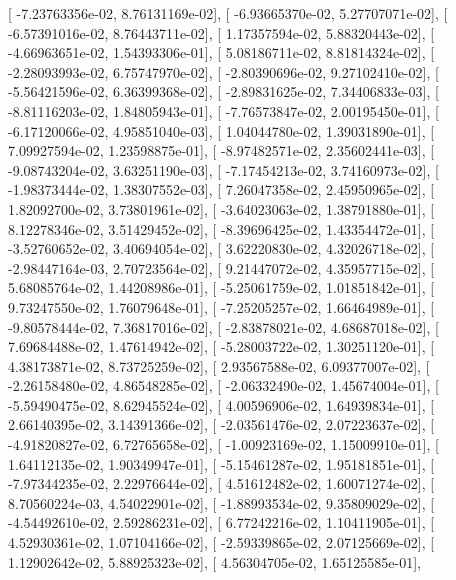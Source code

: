 \documentclass{article}
\begin{document}
       [ -7.23763356e-02,   8.76131169e-02],
       [ -6.93665370e-02,   5.27707071e-02],
       [ -6.57391016e-02,   8.76443711e-02],
       [  1.17357594e-02,   5.88320443e-02],
       [ -4.66963651e-02,   1.54393306e-01],
       [  5.08186711e-02,   8.81814324e-02],
       [ -2.28093993e-02,   6.75747970e-02],
       [ -2.80390696e-02,   9.27102410e-02],
       [ -5.56421596e-02,   6.36399368e-02],
       [ -2.89831625e-02,   7.34406833e-03],
       [ -8.81116203e-02,   1.84805943e-01],
       [ -7.76573847e-02,   2.00195450e-01],
       [ -6.17120066e-02,   4.95851040e-03],
       [  1.04044780e-02,   1.39031890e-01],
       [  7.09927594e-02,   1.23598875e-01],
       [ -8.97482571e-02,   2.35602441e-03],
       [ -9.08743204e-02,   3.63251190e-03],
       [ -7.17454213e-02,   3.74160973e-02],
       [ -1.98373444e-02,   1.38307552e-03],
       [  7.26047358e-02,   2.45950965e-02],
       [  1.82092700e-02,   3.73801961e-02],
       [ -3.64023063e-02,   1.38791880e-01],
       [  8.12278346e-02,   3.51429452e-02],
       [ -8.39696425e-02,   1.43354472e-01],
       [ -3.52760652e-02,   3.40694054e-02],
       [  3.62220830e-02,   4.32026718e-02],
       [ -2.98447164e-03,   2.70723564e-02],
       [  9.21447072e-02,   4.35957715e-02],
       [  5.68085764e-02,   1.44208986e-01],
       [ -5.25061759e-02,   1.01851842e-01],
       [  9.73247550e-02,   1.76079648e-01],
       [ -7.25205257e-02,   1.66464989e-01],
       [ -9.80578444e-02,   7.36817016e-02],
       [ -2.83878021e-02,   4.68687018e-02],
       [  7.69684488e-02,   1.47614942e-02],
       [ -5.28003722e-02,   1.30251120e-01],
       [  4.38173871e-02,   8.73725259e-02],
       [  2.93567588e-02,   6.09377007e-02],
       [ -2.26158480e-02,   4.86548285e-02],
       [ -2.06332490e-02,   1.45674004e-01],
       [ -5.59490475e-02,   8.62945524e-02],
       [  4.00596906e-02,   1.64939834e-01],
       [  2.66140395e-02,   3.14391366e-02],
       [ -2.03561476e-02,   2.07223637e-02],
       [ -4.91820827e-02,   6.72765658e-02],
       [ -1.00923169e-02,   1.15009910e-01],
       [  1.64112135e-02,   1.90349947e-01],
       [ -5.15461287e-02,   1.95181851e-01],
       [ -7.97344235e-02,   2.22976644e-02],
       [  4.51612482e-02,   1.60071274e-02],
       [  8.70560224e-03,   4.54022901e-02],
       [ -1.88993534e-02,   9.35809029e-02],
       [ -4.54492610e-02,   2.59286231e-02],
       [  6.77242216e-02,   1.10411905e-01],
       [  4.52930361e-02,   1.07104166e-02],
       [ -2.59339865e-02,   2.07125669e-02],
       [  1.12902642e-02,   5.88925323e-02],
       [  4.56304705e-02,   1.65125585e-01],
\end{document}
